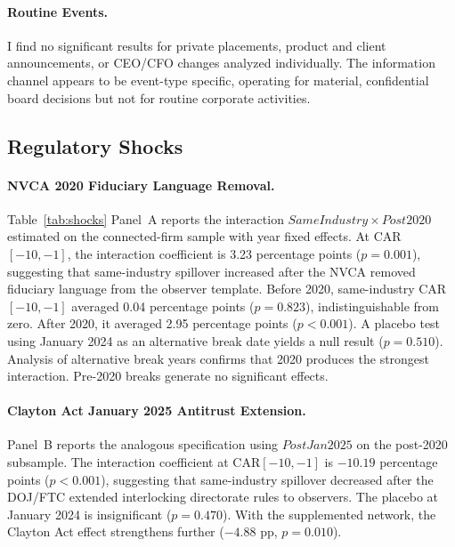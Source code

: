 \paragraph{Routine Events.} I find no significant results for private placements, product and client announcements, or CEO/CFO changes analyzed individually. The information channel appears to be event-type specific, operating for material, confidential board decisions but not for routine corporate activities.

\subsection{Regulatory Shocks}



\paragraph{NVCA 2020 Fiduciary Language Removal.} Table~\ref{tab:shocks} Panel~A reports the interaction $SameIndustry \times Post2020$ estimated on the connected-firm sample with year fixed effects. At CAR$[-10,-1]$, the interaction coefficient is 3.23 percentage points ($p=0.001$), suggesting that same-industry spillover increased after the NVCA removed fiduciary language from the observer template. Before 2020, same-industry CAR$[-10,-1]$ averaged 0.04 percentage points ($p=0.823$), indistinguishable from zero. After 2020, it averaged 2.95 percentage points ($p<0.001$). A placebo test using January 2024 as an alternative break date yields a null result ($p=0.510$). Analysis of alternative break years confirms that 2020 produces the strongest interaction. Pre-2020 breaks generate no significant effects.

\paragraph{Clayton Act January 2025 Antitrust Extension.} Panel~B reports the analogous specification using $PostJan2025$ on the post-2020 subsample. The interaction coefficient at CAR$[-10,-1]$ is $-10.19$ percentage points ($p<0.001$), suggesting that same-industry spillover decreased after the DOJ/FTC extended interlocking directorate rules to observers. The placebo at January 2024 is insignificant ($p=0.470$). With the supplemented network, the Clayton Act effect strengthens further ($-4.88$ pp, $p=0.010$).


